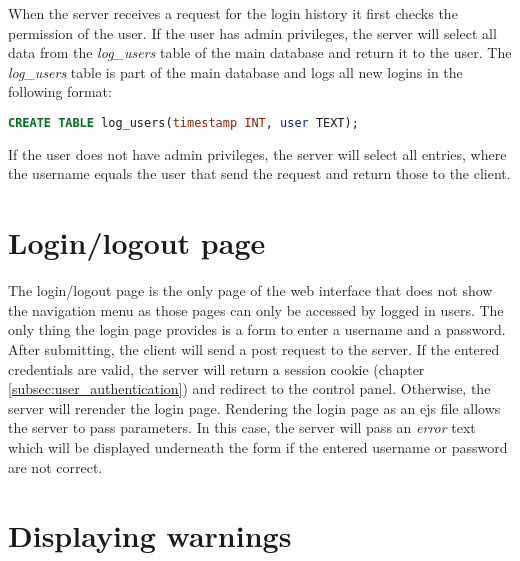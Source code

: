 When the server receives a request for the login history it first checks the permission of the user. If the user has admin privileges, the server will select all data from the \textit{log\_users} table of the main database and return it to the user.  The \textit{log\_users} table is part of the main database and logs all new logins in the following format:

\begin{lstlisting}[label = lst:log_users, language = SQL, numbers = none]
 CREATE TABLE log_users(timestamp INT, user TEXT);
\end{lstlisting}

If the user does not have admin privileges, the server will select all entries, where the username equals the user that send the request and return those to the client.





\section{Login/logout page}
\label{sec:login_and_logout_page}

The login/logout page is the only page of the web interface that does not show the navigation menu as those pages can only be accessed by logged in users. The only thing the login page provides is a form to enter a username and a password. After submitting, the client will send a post request to the server. If the entered credentials are valid, the server will return a session cookie (chapter \ref{subsec:user_authentication}) and redirect to the control panel. Otherwise, the server will rerender the login page. Rendering the login page as an ejs file allows the server to pass parameters. In this case, the server will pass an \textit{error} text which will be displayed underneath the form if the entered username or password are not correct.





\section{Displaying warnings}
\label{sec:displaying_warnings}


